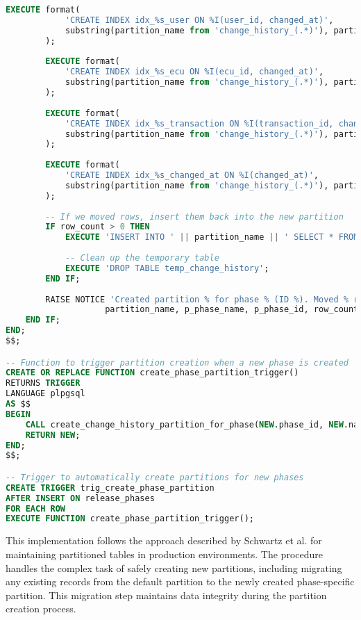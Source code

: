 \begin{lstlisting}[language=SQL, caption={Automatic Partition Creation}, label={lst:auto-partition-creation}]
        EXECUTE format(
            'CREATE INDEX idx_%s_user ON %I(user_id, changed_at)',
            substring(partition_name from 'change_history_(.*)'), partition_name
        );
        
        EXECUTE format(
            'CREATE INDEX idx_%s_ecu ON %I(ecu_id, changed_at)',
            substring(partition_name from 'change_history_(.*)'), partition_name
        );
        
        EXECUTE format(
            'CREATE INDEX idx_%s_transaction ON %I(transaction_id, changed_at)',
            substring(partition_name from 'change_history_(.*)'), partition_name
        );
        
        EXECUTE format(
            'CREATE INDEX idx_%s_changed_at ON %I(changed_at)',
            substring(partition_name from 'change_history_(.*)'), partition_name
        );
        
        -- If we moved rows, insert them back into the new partition
        IF row_count > 0 THEN
            EXECUTE 'INSERT INTO ' || partition_name || ' SELECT * FROM temp_change_history';
            
            -- Clean up the temporary table
            EXECUTE 'DROP TABLE temp_change_history';
        END IF;
        
        RAISE NOTICE 'Created partition % for phase % (ID %). Moved % rows.', 
                    partition_name, p_phase_name, p_phase_id, row_count;
    END IF;
END;
$$;

-- Function to trigger partition creation when a new phase is created
CREATE OR REPLACE FUNCTION create_phase_partition_trigger()
RETURNS TRIGGER
LANGUAGE plpgsql
AS $$
BEGIN
    CALL create_change_history_partition_for_phase(NEW.phase_id, NEW.name);
    RETURN NEW;
END;
$$;

-- Trigger to automatically create partitions for new phases
CREATE TRIGGER trig_create_phase_partition
AFTER INSERT ON release_phases
FOR EACH ROW
EXECUTE FUNCTION create_phase_partition_trigger();
\end{lstlisting}

This implementation follows the approach described by Schwartz et al. \cite{schwartz2012high} for maintaining partitioned tables in production environments. The procedure handles the complex task of safely creating new partitions, including migrating any existing records from the default partition to the newly created phase-specific partition. This migration step maintains data integrity during the partition creation process.

